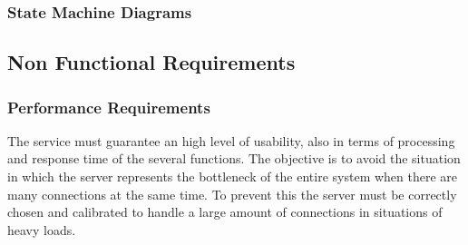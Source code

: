 \documentclass[a4paper,11pt]{report} %
\begin{document}
%	
%
	
	

	
	
	\pagebreak
	
	\subsubsection{State Machine Diagrams}
	
	\pagebreak
		
	\subsection{Non Functional Requirements}
	
	\subsubsection{Performance Requirements} The service must guarantee an high level of usability, also in terms of processing and response time of the several functions. The objective is to avoid the situation in which the server represents the bottleneck of the entire system when there are many connections at the same time. To prevent this the server must be correctly chosen and calibrated to handle a large amount of connections in situations of heavy loads. 
	
\end{document}
